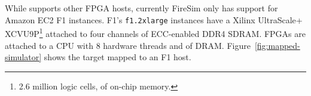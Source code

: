 While \SIMNAME supports other FPGA hosts, currently FireSim only has support for
Amazon EC2 F1 instances. F1's \texttt{f1.2xlarge} instances have a Xilinx
UltraScale+ XCVU9P\footnote{2.6 million logic cells,  of
on-chip memory.}
attached to four  channels of ECC-enabled DDR4 SDRAM.  FPGAs
are attached to a CPU with 8 hardware threads and  of
DRAM. Figure~\ref{fig:mapped-simulator} shows the target mapped to an F1 host.
